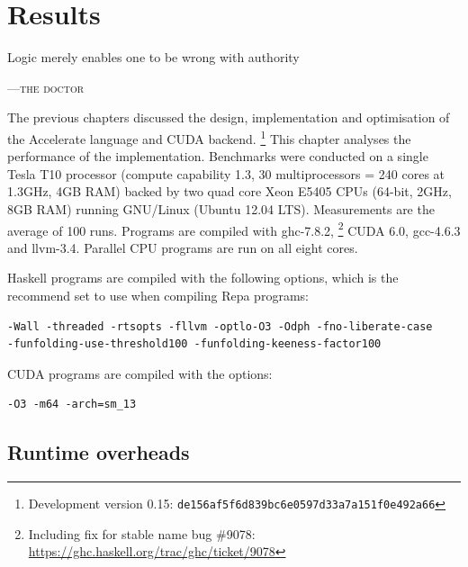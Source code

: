 %
%

\chapter{Results}
\label{ch:results}


\epigraph{Logic merely enables one to be wrong with authority}%
{\textsc{---the doctor}} %


The previous chapters discussed the design, implementation and optimisation of
the Accelerate language and CUDA backend.%
\footnote{Development version 0.15: \texttt{de156af5f6d839bc6e0597d33a7a151f0e492a66}}
This chapter analyses the performance of the implementation. Benchmarks were
conducted on a single Tesla T10 processor (compute capability 1.3, 30
multiprocessors = 240 cores at 1.3GHz, 4GB RAM) backed by two quad core Xeon
E5405 CPUs (64-bit, 2GHz, 8GB RAM) running GNU/Linux (Ubuntu 12.04 LTS).
Measurements are the average of 100 runs. Programs are compiled with
ghc-7.8.2,%
\footnote{Including fix for stable name bug \#9078: \url{https://ghc.haskell.org/trac/ghc/ticket/9078}}
CUDA 6.0, gcc-4.6.3 and llvm-3.4. Parallel CPU programs are run on all eight
cores.

Haskell programs are compiled with the following options, which is the recommend
set to use when compiling Repa programs:
%
\begin{lstlisting}
-Wall -threaded -rtsopts -fllvm -optlo-O3 -Odph -fno-liberate-case
-funfolding-use-threshold100 -funfolding-keeness-factor100
\end{lstlisting}
%
CUDA programs are compiled with the options:
%
\begin{lstlisting}
-O3 -m64 -arch=sm_13
\end{lstlisting}


\section{Runtime overheads}

